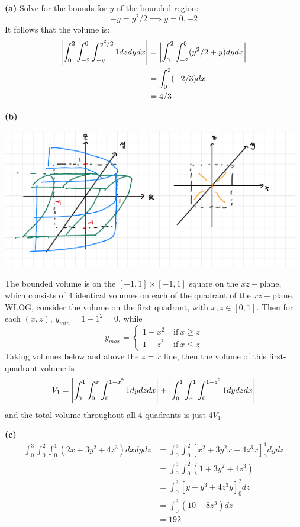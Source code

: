\documentclass[a4paper, 12pt]{article}
\begin{document}
\begin{solution}

    \textbf{(a)} Solve for the bounds for $y$ of the bounded region: \[
    -y = y^2/2 \implies y = 0, -2
    \]
    It follows that the volume is:
    \begin{align*}
    \abs*{\int_{0}^{2} \int_{-2}^{0} \int_{-y}^{y^2/2} 1 dz dy dx} &= \abs*{\int_{0}^{2} \int_{-2}^{0} (y^2/2 + y) dy dx} \\
    &= \int_{0}^{2} (-2/3) dx \\
    &= 4/3
    \end{align*}

    \textbf{(b)}
    \begin{center}
        \includegraphics[width=13cm]{./figures/8.7b.jpeg}
    \end{center}
    The bounded volume is on the $[-1, 1] \times [-1, 1]$ square on the $xz-$plane, which consists of 4 identical volumes on each of the quadrant of the $xz-$plane. WLOG, consider the volume on the first quadrant, with $x, z \in [0, 1]$.
    Then for each $(x, z)$, $y_{min} = 1-1^2 = 0$, while \[
    y_{max} = \begin{cases}
    1-x^2 & \:\text{if}\: x \geq z \\
    1-z^2 & \:\text{if}\: x \leq z
    \end{cases}
    \]
    Taking volumes below and above the $z = x$ line, then the volume of this first-quadrant volume is
    \[
        V_1 = \abs*{\int_{0}^1 \int_{0}^{x} \int_{0}^{1-x^2}1 dy dz dx} + \abs*{ \int_{0}^{1} \int_{x}^{1} \int_{0}^{1-z^2} 1 dy dz dx}
    \]
    and the total volume throughout all 4 quadrants is just $4 V_1$.

    \textbf{(c)}
    \begin{align*}
    \int_{0}^{3} \int_{0}^{2} \int_{0}^{1} (2x + 3y^2 + 4z^3) dx dy dz &= \int_{0}^{3} \int_{0}^{2} \left[x^2 + 3y^2x + 4z^3x\right]_0^1 dy dz \\
    &= \int_{0}^{3} \int_{0}^{2} (1 + 3y^2 + 4z^3) \\
    &= \int_{0}^{3} \left[y + y^3 + 4z^3y\right]_0^2 dz \\
    &= \int_{0}^{3} (10 + 8z^3) dz \\
    &= 192
    \end{align*}
\end{solution}
\end{document}
